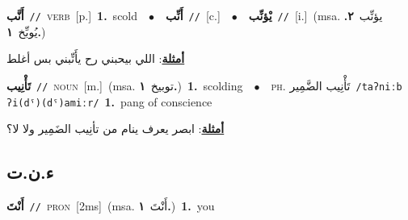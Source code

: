 \documentclass[10pt,a4paper,twoside]{article} %
\begin{document}
\begin{multicols}{2}
{\setlength\topsep{0pt}\textbf{\foreignlanguage{arabic}{أَنَّب}}\ {\color{gray}\texttt{//}\color{black}}\ \textsc{verb}\ [p.]\ \textbf{1.}~scold\ \ $\bullet$\ \ \setlength\topsep{0pt}\textbf{\foreignlanguage{arabic}{أَنِّب}}\ {\color{gray}\texttt{//}\color{black}}\ [c.]\ \ $\bullet$\ \ \setlength\topsep{0pt}\textbf{\foreignlanguage{arabic}{يْؤنِّب}}\ {\color{gray}\texttt{//}\color{black}}\ [i.]\ \color{gray}(msa. \foreignlanguage{arabic}{يؤنِّب}~\foreignlanguage{arabic}{\textbf{٢.}}  \foreignlanguage{arabic}{يُوبِّخ}~\foreignlanguage{arabic}{\textbf{١.}})\color{black}\  \begin{flushright}\color{gray}\foreignlanguage{arabic}{\textbf{\underline{\foreignlanguage{arabic}{أمثلة}}}: اللي بيحبني رح يأَنِّبني بس أغلط}\end{flushright}\color{black}} \vspace{2mm}

{\setlength\topsep{0pt}\textbf{\foreignlanguage{arabic}{تَأْنِيب}}\ {\color{gray}\texttt{//}\color{black}}\ \textsc{noun}\ [m.]\ \color{gray}(msa. \foreignlanguage{arabic}{توبيخ}~\foreignlanguage{arabic}{\textbf{١.}})\color{black}\ \textbf{1.}~scolding\ \ $\bullet$\ \ \textsc{ph.} \color{gray} \foreignlanguage{arabic}{تَأْنِيب الضَّمِير}\color{black}\ {\color{gray}\texttt{/{\sffamily taʔniːb ʔi(dˤ)(dˤ)amiːr}/}\color{black}}\ \textbf{1.}~pang of  conscience\  \begin{flushright}\color{gray}\foreignlanguage{arabic}{\textbf{\underline{\foreignlanguage{arabic}{أمثلة}}}: ابصر يعرف ينام من تأنِيب الضَمِير ولا لا؟}\end{flushright}\color{black}} \vspace{2mm}

\vspace{-3mm}
\subsection*{\color{blue}\foreignlanguage{arabic}{ء.ن.ت}\color{blue}{ (ntws)}} 

{\setlength\topsep{0pt}\textbf{\foreignlanguage{arabic}{أَنْتَ}}\ {\color{gray}\texttt{//}\color{black}}\ \textsc{pron}\ [2ms]\ \color{gray}(msa. \foreignlanguage{arabic}{أَنْتَ}~\foreignlanguage{arabic}{\textbf{١.}})\color{black}\ \textbf{1.}~you\ } \vspace{2mm}


\end{multicols}
\end{document}
